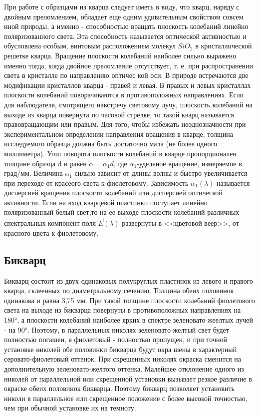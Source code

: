 При работе с образцами из кварца следует иметь в виду, что
кварц, наряду с двойным преломлением, обладает еще одним удивительным свойством совсем иной природы, а именно - способностью
вращать плоскость колебаний линейно поляризованного света. Эта
способность называется оптической активностью и обусловлена особым, винтовым расположением молекул $SiO_2$ в кристаллической решетке кварца. Вращение плоскости колебаний наиболее сильно
выражено именно тогда, когда двойное преломление отсутствует, т.
е. при распространении света в кристалле по направлению оптичес­
кой оси.
В природе встречаются две модификации кристаллов кварца -
правей и левая. В правых и левых кристаллах плоскости колебаний
поворачиваются в противоположных направлениях. Если для наблю­дателя, смотрящего навстречу световому лучу, плоскость колебаний
на выходе из кварца повернута по часовой стрелке, то такой кварц
называется правовращающим или правым. Для того, чтобы избежать
неоднозначности при экспериментальном определении направления
вращения в кварце, толщина исследуемого образца должна быть дос­таточно мала (не более одного миллиметра).
Угол поворота плоскости колебаний в кварце пропорционален
толщине образца d и равен $\alpha=\alpha_1d$, где $\alpha_1$-удельное вращение, измеряемое в град/мм. Величина $\alpha_1$ сильно зависит от длины волны и быстро увеличивается при переходе от красеого света к фиолетовому. 
Зависимость $\alpha_1(\lambda)$ называет­ся дисперсией вращения плоскости колебаний или дисперсией оптической активности.
Если на вход кварцевой пластинки поступает линейно поляризованный белый свет,то на ее выходе плоскости колебаний различных спектральных компонент поля $\vec{E}(\lambda)$ развернуты в <<цветовой
веер>>, от красного цвета к фиолетовому.
\subsection{Бикварц}
Бикварц состоит из двух одинаковых полукруглых пластинок
из левого и правого кварца, склеенных по диаметральному сечению.
Толщина обеих половинок одинакова и равна 3,75 мм. При такой
толщине плоскости колебаний фиолетового света на выходе из би­кварца повернуты в противоположных направлениях на 180°, а плос­кости колебаний наиболее ярких в спектре зеленовато-жеелтых лучей - на 90°. Поэтому, в параллельных николях зеленовато-желтый
свет будет полностью погашен, я фиолетовый - полностью пропущен,
и при точной установке николей обе половинки бикварца будут окра­
шены в характерный серовато-фиолетовый оттенок.
При скрещенных николях окраска сменится на дополнительную
зеленовато-желтого оттенка. Малейшее отклонение одного из николей от параллельной или скрещенной установки вызывает резкое раз­личие в окраске обеих половинок бикварца. Поэтому бикварц позво­ляет установить николи в параллельное или скрещенное положение с
более высокой точностью, чем при обычной установке их на темноту.

